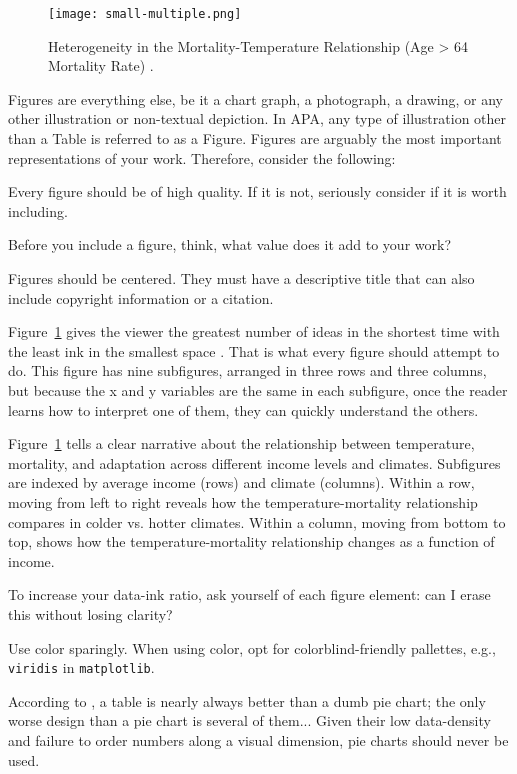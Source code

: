 \begin{figure}
 \centering
 \texttt{[image: small-multiple.png]}
 \caption{\label{fig:mortality_temp}Heterogeneity in the Mortality-Temperature Relationship (Age > 64 Mortality Rate) \citep[soruce:][]{carleton2022valuing}.}
\end{figure}

Figures are everything else, be it a chart graph, a photograph, a drawing, or any other illustration or non-textual depiction. In APA, any type of illustration other than a Table is referred to as a Figure. Figures are arguably the most important representations of your work. Therefore, consider the following:

\begin{tight_itemize}
\item Every figure should be of high quality. If it is not, seriously consider if it is worth including.
\item Before you include a figure, think, what value does it add to your work?
\item Figures should be centered. They must have a descriptive title that can also include copyright information or a citation.
\item Figure~\ref{fig:mortality_temp} gives the viewer the greatest number of ideas in the shortest time with the least ink in the smallest space \citep{englander2024timeless}. That is what every figure should attempt to do. This figure has nine subfigures, arranged in three rows and three columns, but because the x and y variables are the same in each subfigure, once the reader learns how to interpret one of them, they can quickly understand the others.
\item Figure~\ref{fig:mortality_temp} tells a clear narrative about the relationship between temperature, mortality, and adaptation across different income levels and climates. Subfigures are indexed by average income (rows) and climate (columns). Within a row, moving from left to right reveals how the temperature-mortality relationship compares in colder vs. hotter climates. Within a column, moving from bottom to top, shows how the temperature-mortality relationship changes as a function of income.
\item To increase your data-ink ratio, ask yourself of each figure element: can I erase this without losing clarity?
\item Use color sparingly. When using color, opt for colorblind-friendly pallettes, e.g., \texttt{viridis} in \texttt{matplotlib}.
\item According to \citet{carleton2022valuing}, a table is nearly always better than a dumb pie chart; the only worse design than a pie chart is several of them... Given their low data-density and failure to order numbers along a visual dimension, pie charts should never be used.
\end{tight_itemize}

